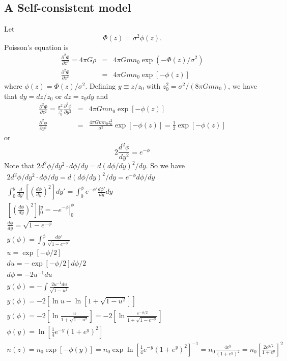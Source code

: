 \documentclass[]{article}
\begin{document}
\subsection{A Self-consistent model}
Let
\begin{equation}
\Phi(z) = \sigma^2\phi(z).
\end{equation}
\noindent
Poisson's equation is
\begin{eqnarray}
\frac{\partial^2\Phi}{\partial z^2} = 4\pi G \rho &=& 4\pi G m n_0 \exp(-\Phi(z)/\sigma^2)\\
\frac{\partial^2\Phi}{\partial z^2}  &=& 4\pi G m n_0 \exp[-\phi(z)]
\end{eqnarray}
\noindent
where $\phi(z)=\Phi(z)/\sigma^2$.
Defining $y \equiv z/z_0$ with $z_0^2 = \sigma^2/(8\pi G m n_0)$, we have
that $dy = dz/z_0$ or $dz = z_0 dy$ and
\begin{eqnarray}
\frac{\partial^2\Phi}{\partial z^2} = \frac{\sigma^2}{z_0^2}\frac{\partial^2\phi}{\partial y^2}  &=& 4\pi G m n_0 \exp[-\phi(z)]\\
\frac{\partial^2\phi}{\partial y^2}  &=& \frac{4\pi G m n_0 z_0^2}{\sigma^2} \exp[-\phi(z)] = \frac{1}{2}\exp[-\phi(z)]
\end{eqnarray}
\noindent
or
\begin{equation}
2 \frac{d^2 \phi}{d y^2} = e^{-\phi}
\end{equation}
\noindent
Note that $2d^2\phi/dy^2 \cdot d\phi/dy = d(d\phi/dy)^2/dy$.  So we have
\begin{eqnarray}
2d^2\phi/dy^2 \cdot d\phi/dy = d(d\phi/dy)^2/dy = e^{-\phi} d\phi/dy\\
\int_{0}^{y} \frac{d}{dy'}\left[\left(\frac{d\phi}{dy}\right)^2\right] dy' = \int_{0}^{\phi} e^{-\phi'} \frac{d\phi'}{dy}dy\\
\left[\left(\frac{d\phi}{dy}\right)^2\right] |_{0}^{y} = -e^{-\phi} |_{0}^{\phi}\\
\frac{d\phi}{dy} = \sqrt{1-e^{-\phi}}\\
y(\phi) = \int_{0}^{\phi}\frac{d\phi'}{\sqrt{1-e^{-\phi'}}}\\
u = \exp[-\phi/2]\\
du = -\exp[-\phi/2] d\phi/2 \\
d\phi = -2 u^{-1} du\\
y(\phi) = -\int \frac{2 u^{-1} du}{\sqrt{1-u^2}}\\ 
y(\phi) = -2[ \ln u - \ln[1 + \sqrt{1-u^2}]]\\
y(\phi) = -2\left[ \ln \frac{u}{1+\sqrt{1-u^2}}\right]= -2\left[ \ln \frac{e^{-\phi/2}}{1+\sqrt{1-e^{-\phi}}}\right]\\
\phi(y) = \ln\left[\frac{1}{4}e^{-y}(1+e^y)^{2}\right]\\
n(z) = n_0 \exp[-\phi(y)] = n_0 \exp  \ln\left[\frac{1}{4}e^{-y}(1+e^y)^{2}\right]^{-1} = n_0 \frac{4 e^y}{(1+e^y)^2} = n_0 \left[\frac{2 e^{y/2}}{1+e^{y}}\right]^2\\
\end{eqnarray}
\end{document}
